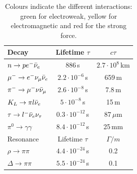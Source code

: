 \documentclass[../main.tex]{subfiles}
\begin{document}
\begin{table}[h]
    \centering
    \begin{tabular}{lcc}
    \hline
    \rowcolor{gray!45}Decay & Lifetime $\tau$ & $c\tau$\\
    \hline
    \rowcolor{green!45}$n\to pe^-\Bar{\nu}_e$ & 886\,s &$2.7\cdot10^8$\,km \\
    \rowcolor{green!45}$\mu^-\to e^-\nu_\mu\Bar{\nu}_e$ & $2.2\cdot10^{-6}$\,s & 659\,m\\
    \rowcolor{green!45}$\pi^-\to \mu^-\nu\Bar{\nu}_\mu$ & $2.6\cdot10^{-8}$\,s & 7.8\,m\\
    \rowcolor{green!45}$K_L\to\pi l\Bar{\nu}_e$ & $5\cdot10^{-8}$\,s & 15\,m\\
    \rowcolor{green!45}$\tau\to l^-\Bar{\nu}_e\nu_\tau$ & $0.3\cdot10^{-12}$\,s & 87\,$\mu$m\\
    \rowcolor{yellow!45}$\pi^0\to\gamma\gamma$ & $8.4\cdot10^{-12}$\,s & 25\,mm\\
    \hline\hline
    \rowcolor{gray!45}Resonance & Lifetime $\tau$ & $\Gamma/m$\\
    \hline
    \rowcolor{red!45}$\rho\to\pi\pi$ & $4.4\cdot10^{-24}$\,s & 0.2\\
    \rowcolor{red!45}$\Delta\to\pi\pi$ & $5.5\cdot10^{-24}$\,s & 0.1\\
    \hline
    \end{tabular}
    \caption{Colours indicate the different interactions: green for electroweak, yellow for electromagnetic and red for the strong force.}
    \label{tab:my_label}
\end{table}\\
\end{document}
